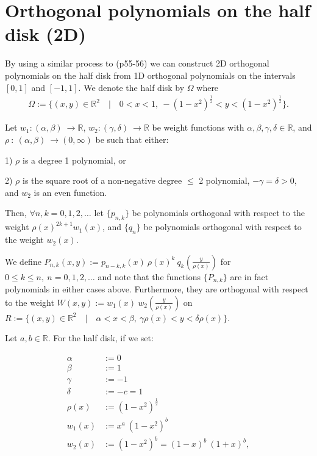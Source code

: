 \documentclass[11pt, oneside]{article}   	%
\newcommand{\half}{\frac{1}{2}}
\newcommand{\R}{\mathbb{R}}
\newcommand{\Pnk}{P_{n,k}}
\begin{document}
\section{Orthogonal polynomials on the half disk (2D)}

By using a similar process to \cite{dunkl2014orthogonal} (p55-56) we can construct 2D orthogonal polynomials on the half disk from 1D orthogonal polynomials on the intervals \([0,1]\) and \([-1,1]\). We denote the half disk by \(\Omega\) where
\begin{align}
\Omega := \{(x,y) \in \R^2 \quad | \quad 0 < x < 1, \: -(1-x^2)^{\half} < y < (1-x^2)^{\half}\}.
\end{align}

Let \(w_1 : (\alpha,\beta) \: \to \R\), \(w_2 : (\gamma,\delta) \: \to \R\) be weight functions with \(\alpha,\beta,\gamma,\delta \in \R\), and \(\rho \: : \: (\alpha,\beta) \: \to (0,\infty)\) be such that either:

1) \(\rho\) is a degree 1 polynomial, or 

2) \(\rho\) is the square root of a non-negative degree \(\le\) 2 polynomial, \(-\gamma = \delta > 0\), and \(w_2\) is an even function.

Then, \(\forall n,k = 0,1,2,\dots\) let \(\{p_{n,k}\}\) be polynomials orthogonal with respect to the weight \(\rho(x)^{2k+1} w_1(x)\), and \(\{q_{n}\}\) be polynomials orthogonal with respect to the weight \(w_2(x)\).

We define \(\Pnk(x,y) := p_{n-k,k}(x) \: \rho(x)^k \: q_k(\frac{y}{\rho(x)})\) for \( 0 \le k \le n, \: n = 0,1,2,\dots\) and note that the functions \(\{\Pnk\}\) are in fact polynomials in either cases above. Furthermore, they are orthogonal with respect to the weight \(W(x,y) := w_1(x) \: w_2(\frac{y}{\rho(x)}) \) on \(R := \{(x,y) \in \R^2 \quad | \quad \alpha < x < \beta, \: \gamma \rho(x) < y < \delta \rho(x)\}\).

Let \(a, b \in \R\). For the half disk, if we set:

\begin{align}
\alpha &:= 0 \\
\beta &:= 1 \\
\gamma &:= -1 \\
\delta &:= -c = 1 \\
\rho(x) &:= (1-x^2)^{\half} \\
w_1(x) &:= x^a \: (1-x^2)^b \\
w_2(x) &:= (1-x^2)^b = (1-x)^b \: (1+x)^b,
\end{align}
\end{document}

